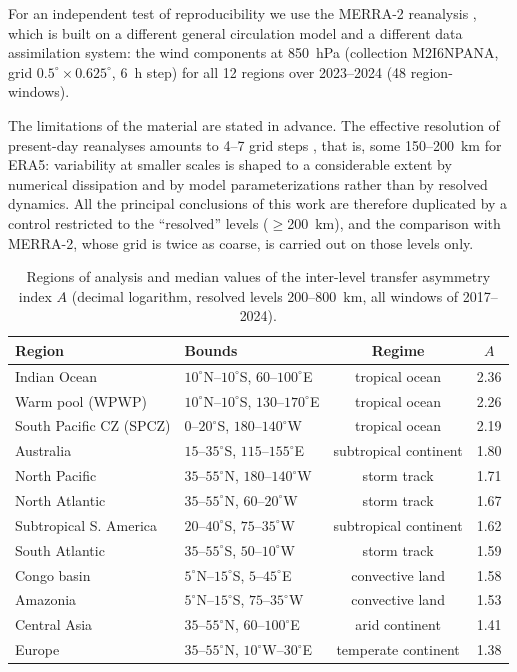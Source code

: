 \documentclass[11pt,a4paper]{article}
\begin{document}
For an independent test of reproducibility we use the MERRA-2 reanalysis \cite{Gelaro2017}, which is built on a different general circulation model and a different data assimilation system: the wind components at 850~hPa (collection M2I6NPANA, grid $0.5^\circ\times0.625^\circ$, 6~h step) for all 12 regions over 2023--2024 (48 region-windows).

The limitations of the material are stated in advance. The effective resolution of present-day reanalyses amounts to 4--7 grid steps \cite{Skamarock2004,Bolgiani2022}, that is, some 150--200~km for ERA5: variability at smaller scales is shaped to a considerable extent by numerical dissipation and by model parameterizations rather than by resolved dynamics. All the principal conclusions of this work are therefore duplicated by a control restricted to the ``resolved'' levels ($\geq$200~km), and the comparison with MERRA-2, whose grid is twice as coarse, is carried out on those levels only.

\begin{table}[t]
\centering
\caption{Regions of analysis and median values of the inter-level transfer asymmetry index $A$ (decimal logarithm, resolved levels 200--800~km, all windows of 2017--2024).}
\label{tab:regions}
\small
\begin{tabular}{@{}llcc@{}}
\toprule
Region & Bounds & Regime & $A$\\
\midrule
Indian Ocean & $10^\circ$N--$10^\circ$S, $60$--$100^\circ$E & tropical ocean & 2.36\\
Warm pool (WPWP) & $10^\circ$N--$10^\circ$S, $130$--$170^\circ$E & tropical ocean & 2.26\\
South Pacific CZ (SPCZ) & $0$--$20^\circ$S, $180$--$140^\circ$W & tropical ocean & 2.19\\
Australia & $15$--$35^\circ$S, $115$--$155^\circ$E & subtropical continent & 1.80\\
North Pacific & $35$--$55^\circ$N, $180$--$140^\circ$W & storm track & 1.71\\
North Atlantic & $35$--$55^\circ$N, $60$--$20^\circ$W & storm track & 1.67\\
Subtropical S. America & $20$--$40^\circ$S, $75$--$35^\circ$W & subtropical continent & 1.62\\
South Atlantic & $35$--$55^\circ$S, $50$--$10^\circ$W & storm track & 1.59\\
Congo basin & $5^\circ$N--$15^\circ$S, $5$--$45^\circ$E & convective land & 1.58\\
Amazonia & $5^\circ$N--$15^\circ$S, $75$--$35^\circ$W & convective land & 1.53\\
Central Asia & $35$--$55^\circ$N, $60$--$100^\circ$E & arid continent & 1.41\\
Europe & $35$--$55^\circ$N, $10^\circ$W--$30^\circ$E & temperate continent & 1.38\\
\bottomrule
\end{tabular}
\end{table}
\end{document}
